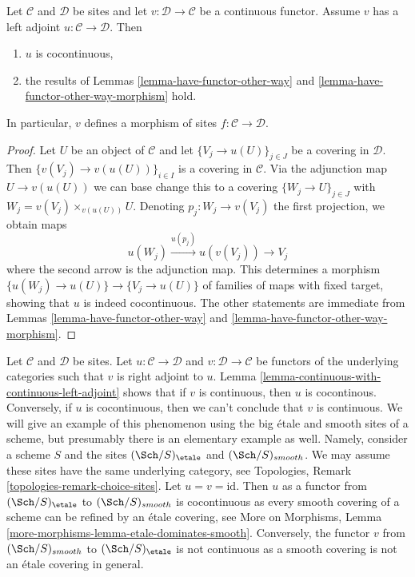\begin{lemma}
\label{lemma-continuous-with-continuous-left-adjoint}
Let $\mathcal{C}$ and $\mathcal{D}$ be sites and let
$v : \mathcal{D} \to \mathcal{C}$ be a continuous functor.
Assume $v$ has a left adjoint $u : \mathcal{C} \to \mathcal{D}$. Then
\begin{enumerate}
\item $u$ is cocontinuous,
\item the results of Lemmas \ref{lemma-have-functor-other-way} and
\ref{lemma-have-functor-other-way-morphism} hold.
\end{enumerate}
In particular, $v$ defines a morphism of sites
$f : \mathcal{C} \to \mathcal{D}$.
\end{lemma}

\begin{proof}
Let $U$ be an object of $\mathcal{C}$ and let $\{V_j \to u(U)\}_{j \in J}$
be a covering in $\mathcal{D}$. Then $\{v(V_j) \to v(u(U))\}_{i \in I}$ is
a covering in $\mathcal{C}$. Via the adjunction map $U \to v(u(U))$ we
can base change this to a covering $\{W_j \to U\}_{j \in J}$ with
$W_j = v(V_j) \times_{v(u(U))} U$. Denoting $p_j : W_j \to v(V_j)$ the
first projection, we obtain maps
$$
u(W_j) \xrightarrow{u(p_j)} u(v(V_j)) \longrightarrow V_j
$$
where the second arrow is the adjunction map. This determines a morphism
$\{u(W_j) \to u(U)\} \to \{V_j \to u(U)\}$ of families of maps with fixed
target, showing that $u$ is indeed cocontinuous. The other statements are
immediate from Lemmas \ref{lemma-have-functor-other-way} and
\ref{lemma-have-functor-other-way-morphism}.
\end{proof}

\begin{example}
\label{example-not-equivalent}
Let $\mathcal{C}$ and $\mathcal{D}$ be sites. Let
$u : \mathcal{C} \to \mathcal{D}$ and $v : \mathcal{D} \to \mathcal{C}$
be functors of the underlying categories such that $v$ is right adjoint to $u$.
Lemma \ref{lemma-continuous-with-continuous-left-adjoint}
shows that if $v$ is continuous, then $u$ is cocontinous.
Conversely, if $u$ is cocontinuous, then we can't conclude that $v$
is continuous. We will give an example of this phenomenon using
the big \'etale and smooth sites of a scheme, but presumably there is an
elementary example as well. Namely, consider a scheme $S$ and the sites
$(\Sch/S)_\etale$ and $(\Sch/S)_{smooth}$. We may assume these
sites have the same underlying category, see
Topologies, Remark \ref{topologies-remark-choice-sites}.
Let $u = v = \text{id}$. Then $u$ as a functor
from $(\Sch/S)_\etale$ to $(\Sch/S)_{smooth}$ is cocontinuous
as every smooth covering of a scheme can be refined by an \'etale
covering, see More on Morphisms, Lemma
\ref{more-morphisms-lemma-etale-dominates-smooth}.
Conversely, the functor $v$ from $(\Sch/S)_{smooth}$ to $(\Sch/S)_\etale$
is not continuous as a smooth covering is not an \'etale covering in general.
\end{example}




